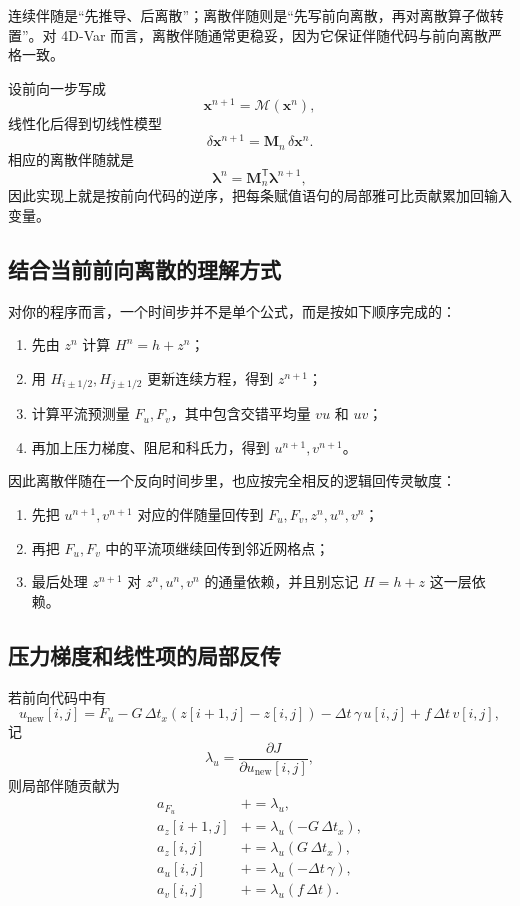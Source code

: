 \documentclass[12pt,a4paper,twoside]{article}
\begin{document}
连续伴随是“先推导、后离散”；离散伴随则是“先写前向离散，再对离散算子做转置”。对 4D-Var 而言，离散伴随通常更稳妥，因为它保证伴随代码与前向离散严格一致。

设前向一步写成
\[
\mathbf{x}^{n+1} = \mathcal{M}(\mathbf{x}^n),
\]
线性化后得到切线性模型
\[
\delta \mathbf{x}^{n+1}
= \mathbf{M}_n \, \delta \mathbf{x}^n.
\]
相应的离散伴随就是
\[
\boldsymbol{\lambda}^n
= \mathbf{M}_n^{\mathsf T}\boldsymbol{\lambda}^{n+1},
\]
因此实现上就是按前向代码的逆序，把每条赋值语句的局部雅可比贡献累加回输入变量。

\subsection*{结合当前前向离散的理解方式}

对你的程序而言，一个时间步并不是单个公式，而是按如下顺序完成的：
\begin{enumerate}
    \item 先由 $z^n$ 计算 $H^n = h + z^n$；
    \item 用 $H_{i\pm1/2}, H_{j\pm1/2}$ 更新连续方程，得到 $z^{n+1}$；
    \item 计算平流预测量 $F_u, F_v$，其中包含交错平均量 $vu$ 和 $uv$；
    \item 再加上压力梯度、阻尼和科氏力，得到 $u^{n+1}, v^{n+1}$。
\end{enumerate}

因此离散伴随在一个反向时间步里，也应按完全相反的逻辑回传灵敏度：
\begin{enumerate}
    \item 先把 $u^{n+1}, v^{n+1}$ 对应的伴随量回传到 $F_u, F_v, z^n, u^n, v^n$；
    \item 再把 $F_u, F_v$ 中的平流项继续回传到邻近网格点；
    \item 最后处理 $z^{n+1}$ 对 $z^n, u^n, v^n$ 的通量依赖，并且别忘记 $H=h+z$ 这一层依赖。
\end{enumerate}

\subsection*{压力梯度和线性项的局部反传}

若前向代码中有
\[
u_{\text{new}}[i,j]
= F_u
- G \,\Delta t_x \left( z[i+1,j]-z[i,j] \right)
- \Delta t\,\gamma\, u[i,j]
+ f\,\Delta t\, v[i,j],
\]
记
\[
\lambda_u = \frac{\partial J}{\partial u_{\text{new}}[i,j]},
\]
则局部伴随贡献为
\begin{align*}
a_{F_u} &\mathrel{+}= \lambda_u, \\
a_z[i+1,j] &\mathrel{+}= \lambda_u (-G\,\Delta t_x), \\
a_z[i,j] &\mathrel{+}= \lambda_u (G\,\Delta t_x), \\
a_u[i,j] &\mathrel{+}= \lambda_u (-\Delta t\,\gamma), \\
a_v[i,j] &\mathrel{+}= \lambda_u (f\,\Delta t).
\end{align*}
\end{document}
